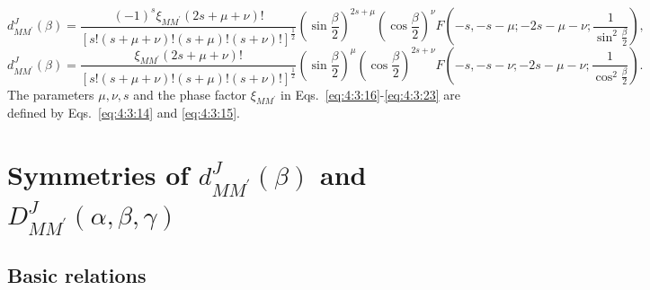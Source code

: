 \begin{equation}
d_{M M^{\prime}}^{J}(\beta)=\frac{(-1)^{s} \xi_{M M^{\prime}}(2 s+\mu+\nu)!}{[s!(s+\mu+\nu)!(s+\mu)!(s+\nu)!]^{\frac{1}{2}}}\left(\sin \frac{\beta}{2}\right)^{2 s+\mu}\left(\cos \frac{\beta}{2}\right)^{\nu} F\left(-s,-s-\mu ;-2 s-\mu-\nu ; \frac{1}{\sin ^{2} \frac{\beta}{2}}\right), \label{eq:4:3:22}
\end{equation}
\begin{equation}
d_{M M^{\prime}}^{J}(\beta)=\frac{\xi_{M M^{\prime}}(2 s+\mu+\nu)!}{[s!(s+\mu+\nu)!(s+\mu)!(s+\nu)!]^{\frac{1}{2}}}\left(\sin \frac{\beta}{2}\right)^{\mu}\left(\cos \frac{\beta}{2}\right)^{2 s+\nu} F\left(-s,-s-\nu ;-2 s-\mu-\nu ;\frac{1}{\cos ^{2} \frac{\beta}{2}}\right). \label{eq:4:3:23}
\end{equation}
The parameters $\mu, \nu, s$ and the phase factor $\xi_{M M^{\prime}}$ in Eqs.~\eqref{eq:4:3:16}-\eqref{eq:4:3:23} are defined by Eqs.~\eqref{eq:4:3:14} and \eqref{eq:4:3:15}.

\section{Symmetries of $d_{M M^{\prime}}^{J}(\beta)$ and $D_{M M^{\prime}}^{J}(\alpha, \beta, \gamma)$}\label{sec:4.4}
\subsection{Basic relations}

